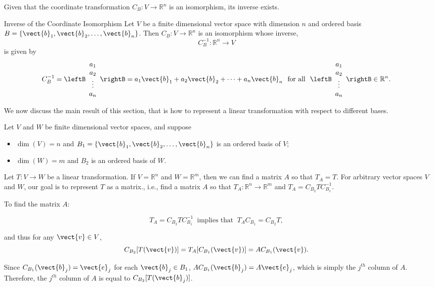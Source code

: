 Given that the coordinate transformation $C_B:V\to\mathbb{R}^n$ is an isomorphism, its inverse exists. 

\begin{theorem}{Inverse of the Coordinate Isomorphism}\label{thm:coordinateinverse}
Let $V$ be a finite dimensional vector space with dimension $n$
and ordered basis $B=\{\vect{b}_1, \vect{b}_2, \ldots, \vect{b}_n\}$.
Then $C_B:V\to\mathbb{R}^n$ is an isomorphism whose inverse,
\[ C_B^{-1}:\mathbb{R}^n\to V\]
is given by
\[  C_B^{-1} =\leftB\begin{array}{c}
a_1 \\ a_2 \\ \vdots \\ a_n \end{array}\rightB =
a_1\vect{b}_1 + a_2\vect{b}_2 + \cdots + a_n\vect{b}_n
~\mbox{ for all }~
\leftB\begin{array}{c}
a_1 \\ a_2 \\ \vdots \\ a_n \end{array}\rightB \in\mathbb{R}^n.  \]
\end{theorem}

We now discuss the main result of this section, that is how
to represent a linear transformation with respect to different
bases.

Let $V$ and $W$ be finite dimensional vector spaces, and suppose
\begin{itemize}
\item $\dim(V)=n$ and $B_1=\{\vect{b}_1, \vect{b}_2, \ldots, \vect{b}_n\}$
is an ordered basis of $V$;
\item $\dim(W)=m$ and $B_2$ is an ordered basis of $W$.
\end{itemize}
Let $T:V\to W$ be a linear transformation.
If $V=\mathbb{R}^n$ and $W=\mathbb{R}^m$, then we can find a
matrix $A$ so that $T_A=T$. For arbitrary vector spaces $V$ and $W$, 
our goal is to represent $T$ as a matrix.,
i.e., 
find a matrix $A$ so that $T_A:\mathbb{R}^n\to\mathbb{R}^m$
and $T_A=C_{B_2}TC_{B_1}^{-1}$.

To find the matrix $A$:

\[ T_A=C_{B_2}TC_{B_1}^{-1}~\mbox{ implies that }~
T_AC_{B_1}=C_{B_2}T,\]

and thus for any $\vect{v}\in V$, 
\[ C_{B_2}[T(\vect{v})] = T_A[C_{B_1}(\vect{v})] 
=AC_{B_1}(\vect{v}).\]

Since $C_{B_1}(\vect{b}_j)=\vect{e}_j$
for each $\vect{b}_j\in B_1$,
$AC_{B_1}(\vect{b}_j)=A\vect{e}_j$, which is simply the
$j^{th}$ column of $A$.
Therefore, the $j^{th}$ column of $A$ is equal to $C_{B_2}[T(\vect{b}_j)]$.

